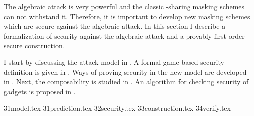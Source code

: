 
The algebraic attack is very powerful and the classic \txor{}-sharing masking schemes can not withstand it. Therefore, it is important to develop new masking schemes which are secure against the algebraic attack. In this section I describe a formalization of security against the algebraic attack and a provably first-order secure construction. 

I start by discussing the attack model in . A formal game-based security definition is given in . Ways of proving security in the new model are developed in . Next, the composability is studied in . An algorithm for checking security of gadgets is proposed in .

{31model.tex}
{31prediction.tex}
{32security.tex}
{33construction.tex}
{34verify.tex}





